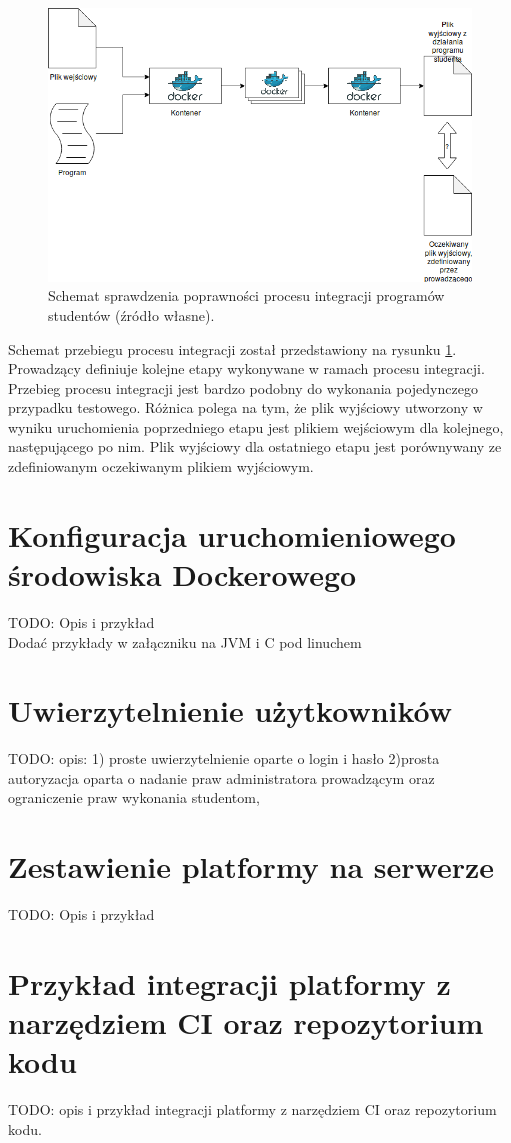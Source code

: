 \begin{figure}[h]
    \centering
    \includegraphics[width = 13cm]{chapter02/integration.png}
    \caption{Schemat sprawdzenia poprawności procesu integracji programów studentów (źródło własne).}
    \label{fig:integration}
\end{figure}

Schemat przebiegu procesu integracji został przedstawiony na rysunku \ref{fig:integration}.
Prowadzący definiuje kolejne etapy wykonywane w ramach procesu integracji.
Przebieg procesu integracji jest bardzo podobny do wykonania pojedynczego przypadku testowego.
Różnica polega na tym, że plik wyjściowy utworzony w wyniku uruchomienia poprzedniego etapu jest plikiem wejściowym dla kolejnego, następującego po nim.
Plik wyjściowy dla ostatniego etapu jest porównywany ze zdefiniowanym oczekiwanym plikiem wyjściowym.

\vfill

\section {Konfiguracja uruchomieniowego środowiska Dockerowego}

TODO: Opis i przykład
\\ Dodać przykłady w załączniku na JVM i C pod linuchem

\section {Uwierzytelnienie użytkowników}
\label{authorization}

TODO: opis:
1) proste uwierzytelnienie oparte o login i hasło
2)prosta autoryzacja oparta o nadanie praw administratora prowadzącym
oraz ograniczenie praw wykonania studentom,

\section {Zestawienie platformy na serwerze}
\label{run-platform}

TODO: Opis i przykład

\section {Przykład integracji platformy z narzędziem CI oraz repozytorium kodu}
\label{ci-integration}

TODO: opis i przykład integracji platformy z narzędziem CI oraz repozytorium
kodu.